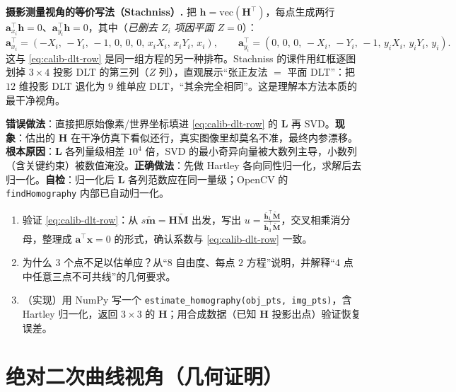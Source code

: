 \begin{note}
\textbf{摄影测量视角的等价写法（Stachniss\cite{stachniss2021zhang}）.}\;
把 $\mathbf{h}=\mathrm{vec}(\mathbf{H}^\top)$，每点生成两行 $\mathbf{a}_{x_i}^\top\mathbf{h}=0$、$\mathbf{a}_{y_i}^\top\mathbf{h}=0$，其中（\emph{已删去 $Z_i$ 项因平面 $Z=0$}）：
\[
  \mathbf{a}_{x_i}^\top=(-X_i,\,-Y_i,\,-1,\,0,\,0,\,0,\,x_iX_i,\,x_iY_i,\,x_i),\qquad
  \mathbf{a}_{y_i}^\top=(0,\,0,\,0,\,-X_i,\,-Y_i,\,-1,\,y_iX_i,\,y_iY_i,\,y_i).
\]
这与 \cref{eq:calib-dlt-row} 是同一组方程的另一种排布。Stachniss 的课件用红框逐图划掉 $3\times4$ 投影 DLT 的第三列（$Z$ 列），直观展示“张正友法 $=$ 平面 DLT”：把 $12$ 维投影 DLT 退化为 $9$ 维单应 DLT，“其余完全相同”。这是理解本方法本质的最干净视角。
\end{note}

\begin{pitfall}
\textbf{错误做法}：直接把原始像素/世界坐标填进 \cref{eq:calib-dlt-row} 的 $\mathbf{L}$ 再 SVD。\textbf{现象}：估出的 $\mathbf{H}$ 在干净仿真下看似还行，真实图像里却莫名不准，最终内参漂移。\textbf{根本原因}：$\mathbf{L}$ 各列量级相差 $10^4$ 倍，SVD 的最小奇异向量被大数列主导，小数列（含关键约束）被数值淹没。\textbf{正确做法}：先做 Hartley 各向同性归一化\cite{hartley1995defence}，求解后去归一化。\textbf{自检}：归一化后 $\mathbf{L}$ 各列范数应在同一量级；OpenCV 的 \texttt{findHomography} 内部已自动归一化。
\end{pitfall}

\begin{practice}[练习]
\begin{enumerate}
  \item 验证 \cref{eq:calib-dlt-row}：从 $s\tilde{\mathbf{m}}=\mathbf{H}\tilde{\mathbf{M}}$ 出发，写出 $u=\frac{\bar{\mathbf{h}}_1^\top\tilde{\mathbf{M}}}{\bar{\mathbf{h}}_3^\top\tilde{\mathbf{M}}}$，交叉相乘消分母，整理成 $\mathbf{a}^\top\mathbf{x}=0$ 的形式，确认系数与 \cref{eq:calib-dlt-row} 一致。
  \item 为什么 $3$ 个点不足以估单应？从“$8$ 自由度、每点 $2$ 方程”说明，并解释“$4$ 点中任意三点不可共线”的几何要求。
  \item （实现）用 NumPy 写一个 \texttt{estimate\_homography(obj\_pts, img\_pts)}，含 Hartley 归一化，返回 $3\times3$ 的 $\mathbf{H}$；用合成数据（已知 $\mathbf{H}$ 投影出点）验证恢复误差。
\end{enumerate}
\end{practice}

\section{绝对二次曲线视角（几何证明）}
\label{sec:calib-iac}

